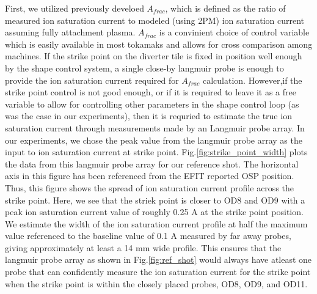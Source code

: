 First, we utilized previously develoed $A_{frac}$\cite{Eldon_2022_PPCF}, which is defined as the ratio of measured ion saturation current to modeled (using 2PM\cite{Leonard_2018_PPCF}) ion saturation current assuming fully attachment plasma.
$A_{frac}$ is a convinient choice of control variable which is easily available in most tokamaks and allows for cross comparison among machines.
If the strike point on the diverter tile is fixed in position well enough by the shape control system, a single close-by langmuir probe is enough to provide the ion saturation current required for $A_{frac}$ calculation.
However,if the strike point control is not good enough, or if it is required to leave it as a free variable to allow for controlling other parameters in the shape control loop (as was the case in our experiments), then it is requried to estimate the true ion saturation current through measurements made by an Langmuir probe array.
In our experiments, we chose the peak value from the langmuir probe array as the input to ion saturation current at strike point.
Fig.\ref{fig:strike_point_width} plots the data from this langmuir probe array for our reference shot.
The horizontal axis in this figure has been referenced from the EFIT reported \ac{OSP} position.
Thus, this figure shows the spread of ion saturation current profile across the strike point.
Here, we see that the striek point is closer to OD8 and OD9 with a peak ion saturation current value of roughly 0.25 A at the strike point position.
We estimate the width of the ion saturation current profile at half the maximum value referenced to the baseline value of 0.1 A measured by far away probes, giving approximately at least a 14 mm wide profile.
This ensures that the langmuir probe array as shown in Fig.\ref{fig:ref_shot} would always have atleast one probe that can confidently measure the ion saturation current for the strike point when the strike point is within the closely placed probes, OD8, OD9, and OD11.

